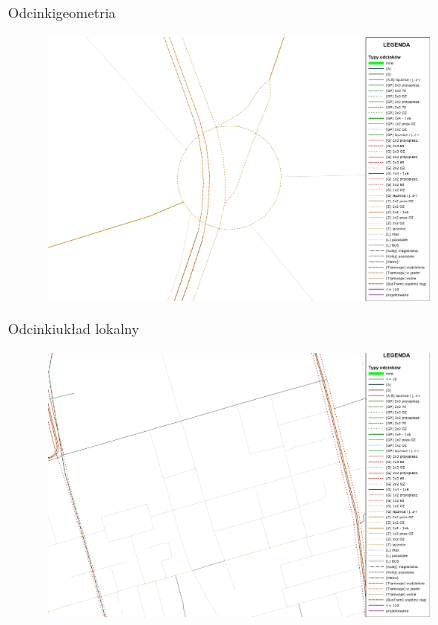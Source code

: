 \documentclass[8pt]{beamer}
\begin{document}
\begin{frame}{Odcinki}{geometria}
\begin{figure}
\begin{center}
\includegraphics[width=0.9\textwidth]{geom}
 \end{center}
  \end{figure} 
\end{frame}

\begin{frame}{Odcinki}{układ lokalny}
\begin{figure}
\begin{center}
\includegraphics[width=0.9\textwidth]{local_roads}
 \end{center}
  \end{figure} 
\end{frame}
\end{document}
